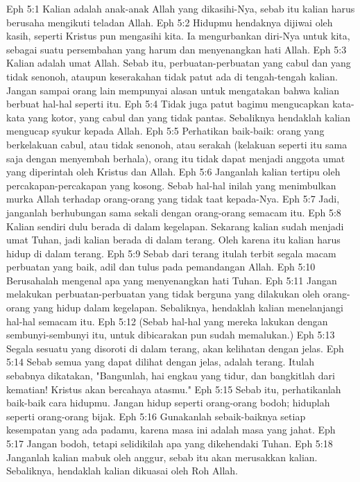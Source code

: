 Eph 5:1  Kalian adalah anak-anak Allah yang dikasihi-Nya, sebab itu kalian harus berusaha mengikuti teladan Allah.
Eph 5:2  Hidupmu hendaknya dijiwai oleh kasih, seperti Kristus pun mengasihi kita. Ia mengurbankan diri-Nya untuk kita, sebagai suatu persembahan yang harum dan menyenangkan hati Allah.
Eph 5:3  Kalian adalah umat Allah. Sebab itu, perbuatan-perbuatan yang cabul dan yang tidak senonoh, ataupun keserakahan tidak patut ada di tengah-tengah kalian. Jangan sampai orang lain mempunyai alasan untuk mengatakan bahwa kalian berbuat hal-hal seperti itu.
Eph 5:4  Tidak juga patut bagimu mengucapkan kata-kata yang kotor, yang cabul dan yang tidak pantas. Sebaliknya hendaklah kalian mengucap syukur kepada Allah.
Eph 5:5  Perhatikan baik-baik: orang yang berkelakuan cabul, atau tidak senonoh, atau serakah (kelakuan seperti itu sama saja dengan menyembah berhala), orang itu tidak dapat menjadi anggota umat yang diperintah oleh Kristus dan Allah.
Eph 5:6  Janganlah kalian tertipu oleh percakapan-percakapan yang kosong. Sebab hal-hal inilah yang menimbulkan murka Allah terhadap orang-orang yang tidak taat kepada-Nya.
Eph 5:7  Jadi, janganlah berhubungan sama sekali dengan orang-orang semacam itu.
Eph 5:8  Kalian sendiri dulu berada di dalam kegelapan. Sekarang kalian sudah menjadi umat Tuhan, jadi kalian berada di dalam terang. Oleh karena itu kalian harus hidup di dalam terang.
Eph 5:9  Sebab dari terang itulah terbit segala macam perbuatan yang baik, adil dan tulus pada pemandangan Allah.
Eph 5:10  Berusahalah mengenal apa yang menyenangkan hati Tuhan.
Eph 5:11  Jangan melakukan perbuatan-perbuatan yang tidak berguna yang dilakukan oleh orang-orang yang hidup dalam kegelapan. Sebaliknya, hendaklah kalian menelanjangi hal-hal semacam itu.
Eph 5:12  (Sebab hal-hal yang mereka lakukan dengan sembunyi-sembunyi itu, untuk dibicarakan pun sudah memalukan.)
Eph 5:13  Segala sesuatu yang disoroti di dalam terang, akan kelihatan dengan jelas.
Eph 5:14  Sebab semua yang dapat dilihat dengan jelas, adalah terang. Itulah sebabnya dikatakan, "Bangunlah, hai engkau yang tidur, dan bangkitlah dari kematian! Kristus akan bercahaya atasmu."
Eph 5:15  Sebab itu, perhatikanlah baik-baik cara hidupmu. Jangan hidup seperti orang-orang bodoh; hiduplah seperti orang-orang bijak.
Eph 5:16  Gunakanlah sebaik-baiknya setiap kesempatan yang ada padamu, karena masa ini adalah masa yang jahat.
Eph 5:17  Jangan bodoh, tetapi selidikilah apa yang dikehendaki Tuhan.
Eph 5:18  Janganlah kalian mabuk oleh anggur, sebab itu akan merusakkan kalian. Sebaliknya, hendaklah kalian dikuasai oleh Roh Allah.
